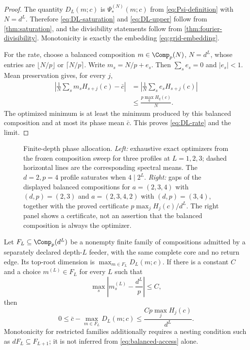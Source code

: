 \begin{proof}
The quantity $D_L(m;c)$ is $\Psi_*^{(N)}(m;c)$ from
\eqref{eq:Psi-definition} with $N=d^L$.  Therefore
\eqref{eq:DL-saturation} and \eqref{eq:DL-upper} follow from
\cref{thm:saturation}, and the divisibility statements follow from
\cref{thm:fourier-divisibility}.  Monotonicity is exactly the embedding
\eqref{eq:grid-embedding}.

For the rate, choose a balanced composition $m\in\Comp_p(N)$, $N=d^L$,
whose entries are $\lfloor N/p\rfloor$ or $\lceil N/p\rceil$.  Write
$m_s=N/p+e_s$.  Then $\sum_se_s=0$ and $|e_s|<1$.  Mean preservation gives,
for every $j$,
\begin{align*}
 \left|\frac1N\sum_sm_sH_{s+j}(c)-\bar c\right|
 &=\left|\frac1N\sum_se_sH_{s+j}(c)\right|\\
 &\leq\frac{p\max_qH_q(c)}{N}.
\end{align*}
The optimized minimum is at least the minimum produced by this balanced
composition and at most its phase mean $\bar c$.  This proves
\eqref{eq:DL-rate} and the limit.
\end{proof}

\begin{figure}[t]
  \centering
  
  \caption{Finite-depth phase allocation.  \emph{Left:} exhaustive exact
  optimizers from the frozen composition sweep for three profiles at
  $L=1,2,3$; dashed horizontal lines are the corresponding spectral means.
  The $d=2,p=4$ profile saturates when $4\mid2^L$.  \emph{Right:} gaps of the
  displayed balanced compositions for $a=(2,3,4)$ with $(d,p)=(2,3)$ and
  $a=(2,3,4,2)$ with $(d,p)=(3,4)$, together with the proved certificate
  $p\max_jH_j(c)/d^L$.  The right panel shows a certificate, not an assertion
  that the balanced composition is always the optimizer.}
  \label{fig:deep-convergence}
\end{figure}

\begin{proposition}
\label{prop:balanced-access}
Let $F_L\subseteq\Comp_p(d^L)$ be a nonempty finite family of compositions
admitted by a separately declared depth-$L$ feeder, with the same complete
core and no return edge.  Its top-root dimension is
$\max_{m\in F_L}D_L(m;c)$.  If there is a constant $C$ and a choice
$m^{(L)}\in F_L$ for every $L$ such that
\begin{equation}
 \max_s\left|m_s^{(L)}-\frac{d^L}{p}\right|\leq C,
 \label{eq:balanced-access}
\end{equation}
then
\begin{equation}
 0\leq \bar c-\max_{m\in F_L}D_L(m;c)
 \leq\frac{Cp\max_jH_j(c)}{d^L}.
 \label{eq:restricted-rate}
\end{equation}
Monotonicity for restricted families additionally requires a nesting
condition such as $dF_L\subseteq F_{L+1}$; it is not inferred from
\eqref{eq:balanced-access} alone.
\end{proposition}

